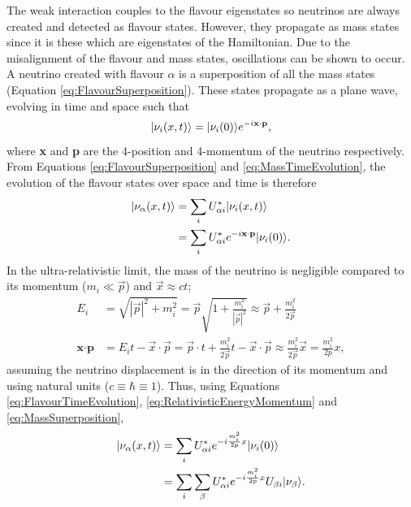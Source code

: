 The weak interaction couples to the flavour eigenstates so neutrinos are always created and detected as flavour states.  However, they propagate as mass states since it is these which are eigenstates of the Hamiltonian.  Due to the misalignment of the flavour and mass states, oscillations can be shown to occur.  A neutrino created with flavour $\alpha$ is a superposition of all the mass states (Equation \ref{eq:FlavourSuperposition}).  These states propagate as a plane wave, evolving in time and space such that
\begin{equation}\label{eq:MassTimeEvolution}
  \lvert\nu_i(x,t)\rangle = \lvert\nu_i (0)\rangle e^{-i \textbf{x} \cdot \textbf{p}},
\end{equation}
where \textbf{x} and \textbf{p} are the 4-position and 4-momentum of the neutrino respectively.  From Equations \ref{eq:FlavourSuperposition} and \ref{eq:MassTimeEvolution}, the evolution of the flavour states over space and time is therefore
\begin{align}
  \nonumber \lvert\nu_{\alpha}(x,t)\rangle &= \sum_i U_{\alpha i}^* \lvert\nu_i (x,t)\rangle \\
  \label{eq:FlavourTimeEvolution} &= \sum_i U_{\alpha i}^* e^{-i \textbf{x} \cdot \textbf{p}} \lvert\nu_i(0)\rangle .
\end{align}
In the ultra-relativistic limit, the mass of the neutrino is negligible compared to its momentum ($m_i \ll \vec{p}$) and $\vec{x} \approx ct$;
\begin{align}
  \label{eq:RelativisticEnergy} E_i &= \sqrt{|\vec{p}|^2+m_i^2} = \vec{p}\sqrt{1+\frac{m_i^2}{|\vec{p}|^2}} \approx \vec{p}+\frac{m_i^2}{2\vec{p}} \\
  \label{eq:RelativisticEnergyMomentum} \textbf{x}\cdot\textbf{p} &= E_i t - \vec{x}\cdot\vec{p} = \vec{p}\cdot t + \frac{m_i^2}{2\vec{p}}t - \vec{x}\cdot\vec{p} \approx \frac{m_i^2}{2\vec{p}}\vec{x} = \frac{m_i^2}{2p}x ,
\end{align}
assuming the neutrino displacement is in the direction of its momentum and using natural units ($c \equiv \hbar \equiv 1$).  Thus, using Equations \ref{eq:FlavourTimeEvolution}, \ref{eq:RelativisticEnergyMomentum} and \ref{eq:MassSuperposition},
\begin{align}
  \nonumber \lvert\nu_{\alpha}(x,t)\rangle &= \sum_i U_{\alpha i}^* e^{-i \frac{m_i^2}{2p} x} \lvert\nu_i (0)\rangle \\
  \label{eq:FlavourEvolution} &= \sum_i \sum_{\beta} U_{\alpha i}^* e^{-i \frac{m_i^2}{2p} x} U_{\beta i} \lvert\nu_{\beta}\rangle.
\end{align}

